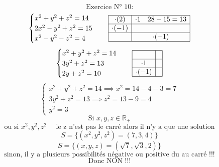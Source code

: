 \documentclass{article}
\begin{document}
\[
\text{Exercice N° 10:}
\]
\[
\begin{cases}
x^2+y^2+z^2=14 \\
2x^2-y^2+z^2=15 \\
x^2-y^2-z^2=4
\end{cases}
\quad
\begin{array}{|c|c|}
\hline
\cdot (2) & \cdot 1 \quad 28-15=13 \\
\hline
\cdot (-1) & \\
\hline
& \cdot (-1) \\
\hline
\end{array}
\]
\[
\begin{cases}
x^2+y^2+z^2=14 \\
3y^2+z^2=13 \\
2y+z^2=10
\end{cases}
\quad
\begin{array}{|c|c|}
\hline
& \\
\hline
\cdot 1 & \\
\hline
\cdot (-1) & \\
\hline
\end{array}
\]
\[
\begin{cases}
x^2+y^2+z^2=14 \implies x^2=14-4-3=7 \\
3y^2+z^2=13 \implies z^2=13-9=4 \\
y^2=3
\end{cases}
\]
\[
\text{Si } x, y, z \in \mathbb{R}_+
\]
\[
\text{ou si } x^2, y^2, z^2 \quad \text{ le z n'est pas le carré alors il n'y a que une solution}
\]
\[
S = \{(x^2, y^2, z^2) = (7, 3, 4)\}
\]
\[
S = \{(x, y, z) = (\sqrt{7}, \sqrt{3}, 2)\}
\]
\[
\text{sinon, il y a plusieurs possibilités négative ou positive du au carré !!!}
\]
\[
\text{Donc NON !!!}
\]
\end{document}
